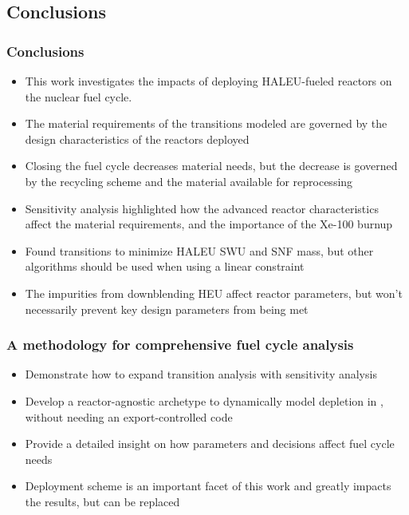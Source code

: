 \subsection{Conclusions}
\begin{frame}
      \frametitle{Conclusions}
      \begin{itemize}
        \item This work investigates the impacts of deploying \gls{HALEU}-fueled 
              reactors on the nuclear fuel cycle.
        \item<2-> The material requirements of the transitions modeled are governed 
              by the design characteristics of the reactors deployed
        \item<2-> Closing the fuel cycle decreases material needs, but the 
              decrease is governed by the recycling scheme and the 
              material available for reprocessing
        \item<3-> Sensitivity analysis highlighted how the 
              advanced reactor characteristics affect the material requirements, and 
              the importance of the Xe-100 burnup
        \item<3-> Found transitions to minimize \gls{HALEU} \gls{SWU} 
              and \gls{SNF} mass, but other algorithms should 
              be used when using a linear constraint
        \item<4-> The impurities from downblending \gls{HEU} affect 
              reactor parameters, but won't necessarily prevent key design 
              parameters from being met
      \end{itemize}
\end{frame}

\begin{frame}
      \frametitle{A methodology for comprehensive fuel cycle analysis}
      \begin{itemize}
            \item Demonstrate how to expand transition analysis with 
                  sensitivity analysis
            \item Develop a reactor-agnostic archetype to dynamically model depletion 
                  in \Cyclus, without needing an export-controlled code
            \item<2-> Provide a detailed insight on how parameters and 
                  decisions affect fuel cycle needs
            \item<3-> Deployment scheme is an important facet of this work and 
                  greatly impacts the results, but can be replaced
      \end{itemize}
\end{frame}

